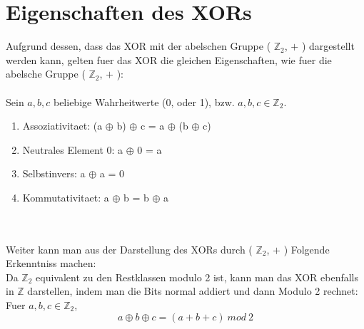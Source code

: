 \documentclass[a4paper,10pt,ngerman]{scrartcl}
\begin{document}
\section{Eigenschaften des XORs}
Aufgrund dessen, dass das XOR mit der abelschen Gruppe ( \(\mathbb{Z}_{2}\), \(+\) ) dargestellt werden kann, gelten fuer das XOR die gleichen Eigenschaften, wie fuer die abelsche Gruppe ( \(\mathbb{Z}_{2}\), \(+\) ):
\\\\Sein \(a, b, c\) beliebige Wahrheitwerte (0, oder 1), bzw. \(a, b, c \in \mathbb{Z}_{2}\).
\begin{enumerate}
	\item Assoziativitaet: (a \(\oplus\) b) \(\oplus\) c = a \(\oplus\) (b \(\oplus\) c)
	\item Neutrales Element 0: a \(\oplus\) 0 = a
	\item Selbstinvers: a \(\oplus\) a = 0
	\item Kommutativitaet: a \(\oplus\) b = b \(\oplus\) a
\end{enumerate}
\\\\Weiter kann man aus der Darstellung des XORs durch ( \(\mathbb{Z}_{2}\), \(+\) ) Folgende Erkenntniss machen:\\
Da \(\mathbb{Z}_{2}\) equivalent zu den Restklassen modulo 2 ist, kann man das XOR ebenfalls in \(\mathbb{Z}\) darstellen, indem man die Bits normal addiert und dann Modulo 2 rechnet:\\
Fuer \(a, b, c \in \mathbb{Z}_{2}\),
\[a \oplus b \oplus c = (a + b + c) \ mod \ 2\]
\end{document}
